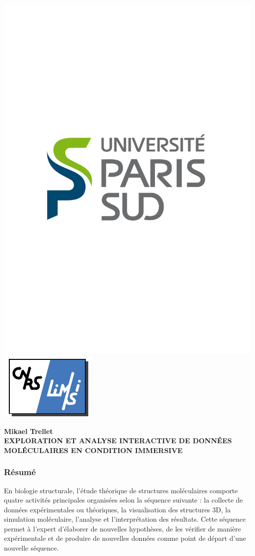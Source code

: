 \backmatter 
\chapter*{}%
\pagestyle{empty}

\setlength{\headheight}{0.pt}
        
\includegraphics[height=1.cm]{./figures/LogoUPSUD.pdf}\hfill
\includegraphics[height=1.cm]{./figures/limsilogo_vectoriel.pdf}\hfill


\begin{center}
 \textbf{Mikael Trellet} \\
 \textbf{EXPLORATION ET ANALYSE INTERACTIVE DE DONNÉES MOLÉCULAIRES EN CONDITION IMMERSIVE}
\end{center}
    

\footnotesize
\subsection*{Résumé}












\footnotesize
En biologie structurale, l'étude théorique de structures moléculaires comporte quatre activités principales organisées selon la séquence suivante : la collecte de données expérimentales ou théoriques, la visualisation des structures 3D, la simulation moléculaire, l'analyse et l'interprétation des résultats. Cette séquence permet à l'expert d'élaborer de nouvelles hypothèses, de les vérifier de manière expérimentale et de produire de nouvelles données comme point de départ d'une nouvelle séquence.

